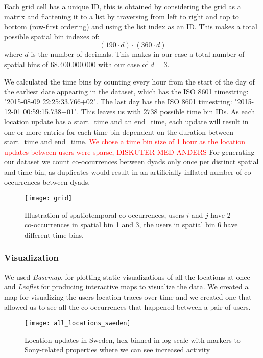 Each grid cell has a unique ID, this is obtained by considering the grid as a matrix and flattening it to a list by traversing from left to right and top to bottom (row-first ordering) and using the list index as an ID. This makes a total possible spatial bin indexes of: $$(190 \cdot d)\cdot(360\cdot d)$$ where $d$ is the number of decimals. This makes in our case a total number of spatial bins of $68.400.000.000$ with our case of $d=3$.

We calculated the time bins by counting every hour from the start of the day of the earliest date appearing in the dataset, which has the ISO 8601 timestring: "2015-08-09 22:25:33.766+02". The last day has the ISO 8601 timestring: "2015-12-01 00:59:15.738+01". This leaves us with $2738$ possible time bin IDs. As each location update has a start\_time and an end\_time, each update will result in one or more entries for each time bin dependent on the duration between start\_time and end\_time. \textcolor{red}{We chose a time bin size of 1 hour as the location updates between users were sparse, DISKUTER MED ANDERS}  For generating our dataset we count co-occurrences between dyads only once per distinct spatial and time bin, as duplicates would result in an artificially inflated number of co-occurrences between dyads.
\begin{figure}[H]
    \hspace*{-1.0cm}
    \centering
    \texttt{[image: grid]}
    \caption{Illustration of spatiotemporal co-occurrences, users $i$ and $j$ have 2 co-occurrences in spatial bin 1 and 3, the users in spatial bin 6 have different time bins.}
    \label{fig:binning}
\end{figure}

\subsubsection{Visualization}
We used \textit{Basemap}\cite{basemap}, for plotting static visualizations of all the locations at once and \textit{Leaflet}\cite{leaflet} for producing interactive maps to visualize the data. We created a map for visualizing the users location traces over time and we created one that allowed us to see all the co-occurrences that happened between a pair of users.
\begin{figure}[H]
    \hspace*{-1.0cm}
    \centering
    \texttt{[image: all\_locations\_sweden]}
    \caption{Location updates in Sweden, hex-binned in log scale with markers to Sony-related properties where we can see increased activity}
    \label{fig:sweden_locations_hexbin}
\end{figure}

